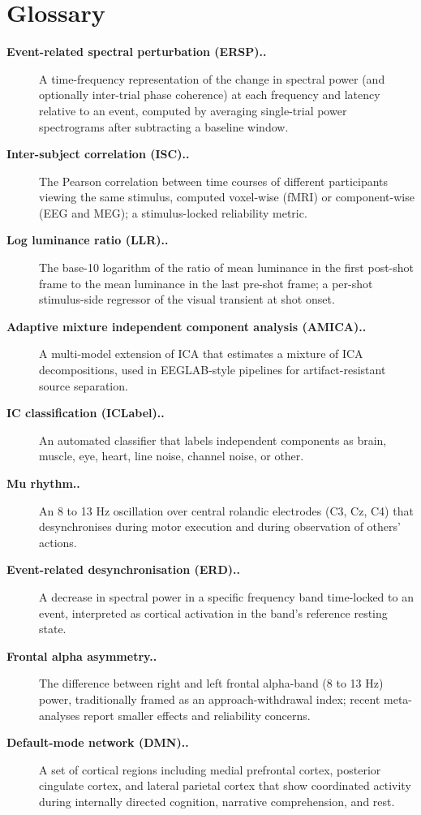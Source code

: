 \documentclass[preprint,12pt]{elsarticle}
\begin{document}
\section*{Glossary}
\begin{description}
  \item[\textbf{Event-related spectral perturbation (ERSP)..}] A time-frequency representation of the change in spectral power (and optionally inter-trial phase coherence) at each frequency and latency relative to an event, computed by averaging single-trial power spectrograms after subtracting a baseline window.
  \item[\textbf{Inter-subject correlation (ISC)..}] The Pearson correlation between time courses of different participants viewing the same stimulus, computed voxel-wise (fMRI) or component-wise (EEG and MEG); a stimulus-locked reliability metric.
  \item[\textbf{Log luminance ratio (LLR)..}] The base-10 logarithm of the ratio of mean luminance in the first post-shot frame to the mean luminance in the last pre-shot frame; a per-shot stimulus-side regressor of the visual transient at shot onset.
  \item[\textbf{Adaptive mixture independent component analysis (AMICA)..}] A multi-model extension of ICA that estimates a mixture of ICA decompositions, used in EEGLAB-style pipelines for artifact-resistant source separation.
  \item[\textbf{IC classification (ICLabel)..}] An automated classifier that labels independent components as brain, muscle, eye, heart, line noise, channel noise, or other.
  \item[\textbf{Mu rhythm..}] An 8 to 13 Hz oscillation over central rolandic electrodes (C3, Cz, C4) that desynchronises during motor execution and during observation of others' actions.
  \item[\textbf{Event-related desynchronisation (ERD)..}] A decrease in spectral power in a specific frequency band time-locked to an event, interpreted as cortical activation in the band's reference resting state.
  \item[\textbf{Frontal alpha asymmetry..}] The difference between right and left frontal alpha-band (8 to 13 Hz) power, traditionally framed as an approach-withdrawal index; recent meta-analyses report smaller effects and reliability concerns.
  \item[\textbf{Default-mode network (DMN)..}] A set of cortical regions including medial prefrontal cortex, posterior cingulate cortex, and lateral parietal cortex that show coordinated activity during internally directed cognition, narrative comprehension, and rest.

\end{description}
\end{document}

